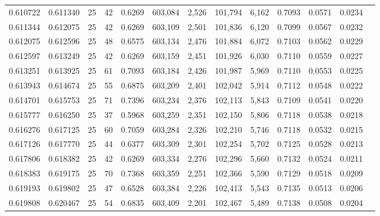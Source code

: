 \begin{tabular}{rrrrrrrrrrrrr}
0.610722 & 0.611340 &    25 &  42 &                                     0.6269 & 603,084 &   2,526 & 101,794 &   6,162 & 0.7093 & 0.0571 & 0.0234 \\
0.611344 & 0.612075 &    25 &  42 &                                     0.6269 & 603,109 &   2,501 & 101,836 &   6,120 & 0.7099 & 0.0567 & 0.0232 \\
0.612075 & 0.612596 &    25 &  48 &                                     0.6575 & 603,134 &   2,476 & 101,884 &   6,072 & 0.7103 & 0.0562 & 0.0229 \\
0.612597 & 0.613249 &    25 &  42 &                                     0.6269 & 603,159 &   2,451 & 101,926 &   6,030 & 0.7110 & 0.0559 & 0.0227 \\
0.613251 & 0.613925 &    25 &  61 &                                     0.7093 & 603,184 &   2,426 & 101,987 &   5,969 & 0.7110 & 0.0553 & 0.0225 \\
0.613943 & 0.614674 &    25 &  55 &                                     0.6875 & 603,209 &   2,401 & 102,042 &   5,914 & 0.7112 & 0.0548 & 0.0222 \\
0.614701 & 0.615753 &    25 &  71 &                                     0.7396 & 603,234 &   2,376 & 102,113 &   5,843 & 0.7109 & 0.0541 & 0.0220 \\
0.615777 & 0.616250 &    25 &  37 &                                     0.5968 & 603,259 &   2,351 & 102,150 &   5,806 & 0.7118 & 0.0538 & 0.0218 \\
0.616276 & 0.617125 &    25 &  60 &                                     0.7059 & 603,284 &   2,326 & 102,210 &   5,746 & 0.7118 & 0.0532 & 0.0215 \\
0.617126 & 0.617770 &    25 &  44 &                                     0.6377 & 603,309 &   2,301 & 102,254 &   5,702 & 0.7125 & 0.0528 & 0.0213 \\
0.617806 & 0.618382 &    25 &  42 &                                     0.6269 & 603,334 &   2,276 & 102,296 &   5,660 & 0.7132 & 0.0524 & 0.0211 \\
0.618383 & 0.619175 &    25 &  70 &                                     0.7368 & 603,359 &   2,251 & 102,366 &   5,590 & 0.7129 & 0.0518 & 0.0209 \\
0.619193 & 0.619802 &    25 &  47 &                                     0.6528 & 603,384 &   2,226 & 102,413 &   5,543 & 0.7135 & 0.0513 & 0.0206 \\
0.619808 & 0.620467 &    25 &  54 &                                     0.6835 & 603,409 &   2,201 & 102,467 &   5,489 & 0.7138 & 0.0508 & 0.0204 \\

\end{tabular}

